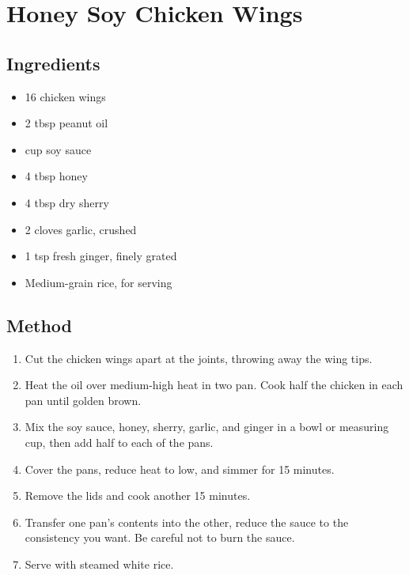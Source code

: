 \section{Honey Soy Chicken Wings}


\subsection{Ingredients}

\begin{itemize}
    \item 16 chicken wings
    \item 2 tbsp peanut oil
    \item {} cup soy sauce
    \item 4 tbsp honey
    \item 4 tbsp dry sherry
    \item 2 cloves garlic, crushed
    \item 1 tsp fresh ginger, finely grated
    \item Medium-grain rice, for serving
\end{itemize}

\subsection{Method}

\begin{enumerate}
    \item Cut the chicken wings apart at the joints, throwing away the wing tips.
    \item Heat the oil over medium-high heat in two pan. Cook half the chicken in each pan until golden brown.
    \item Mix the soy sauce, honey, sherry, garlic, and ginger in a bowl or measuring cup, then add half to each of the pans.
    \item Cover the pans, reduce heat to low, and simmer for 15 minutes.
    \item Remove the lids and cook another 15 minutes.
    \item Transfer one pan's contents into the other, reduce the sauce to the consistency you want. Be careful not to burn the sauce.
    \item Serve with steamed white rice.
\end{enumerate}
